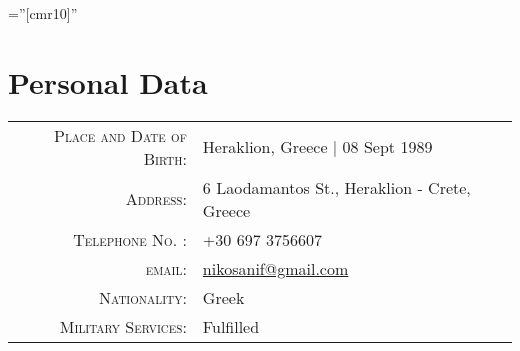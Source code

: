 \documentclass[11pt]{article}
\begin{document}

\font\fb=''[cmr10]'' %

\par{\par}
\par{\bigskip\par}
\par{\centering { \textsc{\textcolor{red}{Last Update: December 2020}}}\bigskip\par}

\section{Personal Data}
\begin{tabular}{rl}
    \textsc{Place and Date of Birth:} & Heraklion, Greece  | 08 Sept 1989 \\
    \textsc{Address:}   & 6 Laodamantos St., Heraklion - Crete, Greece\\
    \textsc{Telephone No. :}     & +30 697 3756607\\
    \textsc{email:}     & \href{mailto:nikosanif@gmail.com}{nikosanif@gmail.com}\\
    \textsc{Nationality:}     & Greek\\
    \textsc{Military Services:}     & Fulfilled\\
\end{tabular}


\end{document}
